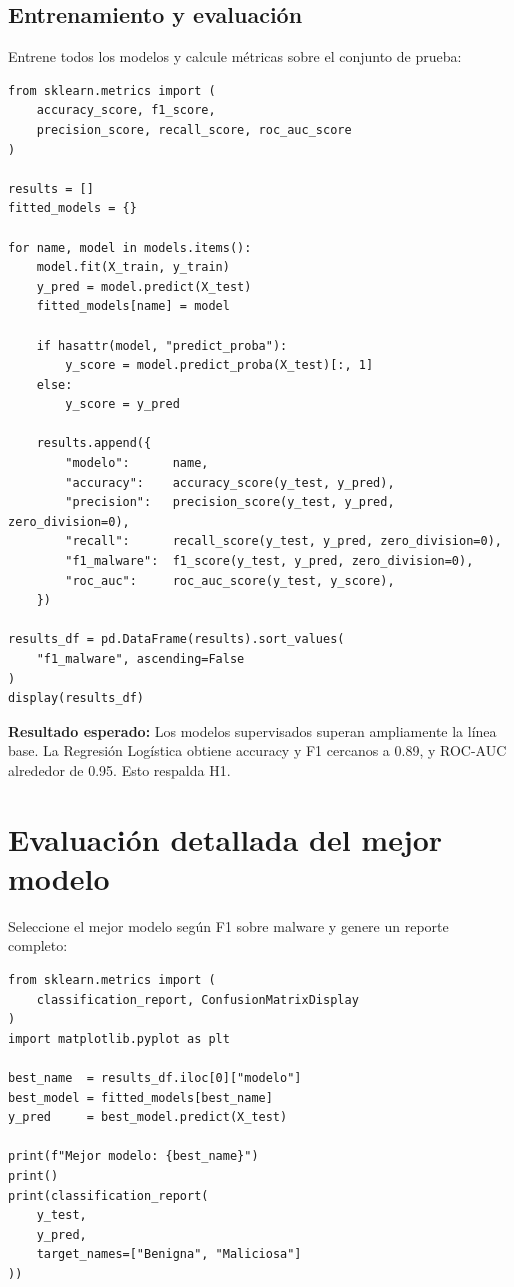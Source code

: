 \documentclass[
  coursetitle={Cómputo Nube y Tecnologías Emergentes},
  coursehours={96},
  coursedate={Verano 2026},
  doctype={Tutorial},
  otherlangs={english,french},
  authorname={Lázaro},
  authorsurname={Bustio-Martínez},
  authortitle={PhD},
  role={Profesor Investigador},
  email={lbustio@inaoe.mx},
  phone={5559504000},
  ext={7459},
  institution={Instituto Nacional de Astrofísica, Óptica y Electrónica (INAOE)},
  department={Maestría en Ciencias en Tecnologías de Seguridad},
  address={Luis Enrique Erro 1, Sta. Ma. Tonantzintla, San Andrés Cholula, CP 72840, Puebla, México},
  margin={0.5in}
]{../../lbustio_lecture_notes}
\begin{document}
\subsection{Entrenamiento y evaluación}

Entrene todos los modelos y calcule métricas sobre el conjunto de prueba:

\begin{lstlisting}
from sklearn.metrics import (
    accuracy_score, f1_score,
    precision_score, recall_score, roc_auc_score
)

results = []
fitted_models = {}

for name, model in models.items():
    model.fit(X_train, y_train)
    y_pred = model.predict(X_test)
    fitted_models[name] = model

    if hasattr(model, "predict_proba"):
        y_score = model.predict_proba(X_test)[:, 1]
    else:
        y_score = y_pred

    results.append({
        "modelo":      name,
        "accuracy":    accuracy_score(y_test, y_pred),
        "precision":   precision_score(y_test, y_pred, zero_division=0),
        "recall":      recall_score(y_test, y_pred, zero_division=0),
        "f1_malware":  f1_score(y_test, y_pred, zero_division=0),
        "roc_auc":     roc_auc_score(y_test, y_score),
    })

results_df = pd.DataFrame(results).sort_values(
    "f1_malware", ascending=False
)
display(results_df)
\end{lstlisting}

\textbf{Resultado esperado:} Los modelos supervisados superan ampliamente la línea base. La Regresión Logística obtiene accuracy y F1 cercanos a 0.89, y ROC-AUC alrededor de 0.95. Esto respalda H1.

\section{Evaluación detallada del mejor modelo}

Seleccione el mejor modelo según F1 sobre malware y genere un reporte completo:

\begin{lstlisting}
from sklearn.metrics import (
    classification_report, ConfusionMatrixDisplay
)
import matplotlib.pyplot as plt

best_name  = results_df.iloc[0]["modelo"]
best_model = fitted_models[best_name]
y_pred     = best_model.predict(X_test)

print(f"Mejor modelo: {best_name}")
print()
print(classification_report(
    y_test,
    y_pred,
    target_names=["Benigna", "Maliciosa"]
))
\end{lstlisting}
\end{document}
